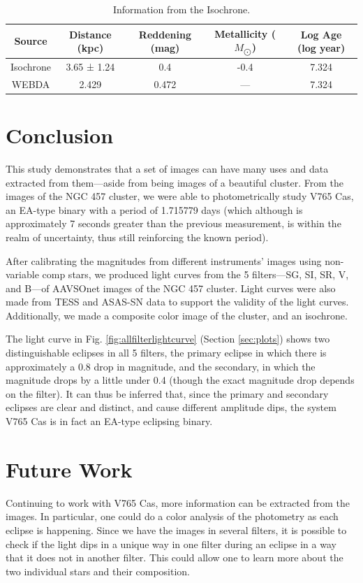 \documentclass[linenumbers]{aastex631}
\begin{document}
\begin{table}[H]
\caption{Information from the Isochrone. \label{tabisoinfo}}
\begin{tabular}{ | c | c | c | c | c | }
    \hline
     Source & Distance (kpc) & Reddening (mag) & Metallicity ($M_{\bigodot}$) & Log Age (log year) \\
    \hline
    \hline
    Isochrone &  3.65 ± 1.24 & 0.4 & -0.4 & 7.324 \\
    \hline
    WEBDA & 2.429 & 0.472 & --- & 7.324 \\
    \hline
\end{tabular}
\end{table}

\section{Conclusion}
\label{sec:concl}
This study demonstrates that a set of images can have many uses and data extracted from them—aside from being images of a beautiful cluster. From the images of the NGC 457 cluster, we were able to photometrically study V765 Cas, an EA-type binary with a period of 1.715779 days (which although is approximately 7 seconds greater than the previous measurement, is within the realm of uncertainty, thus still reinforcing the known period).

After calibrating the magnitudes from different instruments’ images using non-variable comp stars, we produced light curves from the 5 filters—SG, SI, SR, V, and B—of AAVSOnet images of the NGC 457 cluster. Light curves were also made from TESS and ASAS-SN data to support the validity of the light curves. Additionally, we made a composite color image of the cluster, and an isochrone.

The light curve in Fig. \ref{fig:allfilterlightcurve} (Section \ref{sec:plots}) shows two distinguishable eclipses in all 5 filters, the primary eclipse in which there is approximately a 0.8 drop in magnitude, and the secondary, in which the magnitude drops by a little under 0.4 (though the exact magnitude drop depends on the filter). It can thus be inferred that, since the primary and secondary eclipses are clear and distinct, and cause different amplitude dips, the system V765 Cas is in fact an EA-type eclipsing binary. 

\section{Future Work}
\label{sec:fut}
Continuing to work with V765 Cas, more information can be extracted from the images. In particular, one could do a color analysis of the photometry as each eclipse is happening. Since we have the images in several filters, it is possible to check if the light dips in a unique way in one filter during an eclipse in a way that it does not in another filter. This could allow one to learn more about the two individual stars and their composition.
\end{document}
